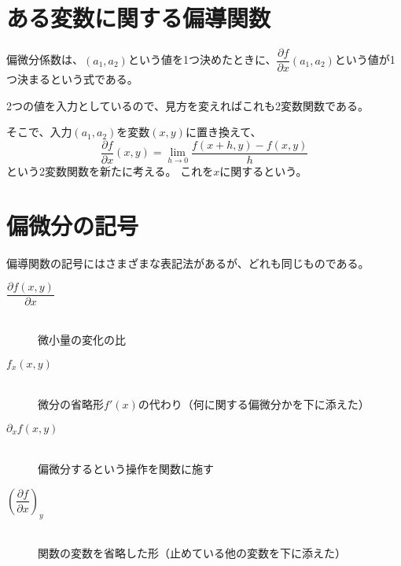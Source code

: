 \documentclass[../../../topic_multivariable-calculus]{subfiles}
\begin{document}
\sectionline
\section{ある変数に関する偏導関数}

偏微分係数は、$(a_1,a_2)$という値を1つ決めたときに、$\dfrac{\partial f}{\partial x}(a_1,a_2)$という値が1つ決まるという式である。

2つの値を入力としているので、見方を変えればこれも2変数関数である。

\br

そこで、入力$(a_1,a_2)$を変数$(x,y)$に置き換えて、
\begin{equation*}
  \dfrac{\partial f}{\partial x}(x,y) = \lim_{h \to 0} \frac{f(x + h, y) - f(x, y)}{h}
\end{equation*}
という2変数関数を新たに考える。
これを$x$に関するという。

\sectionline
\section{偏微分の記号}

偏導関数の記号にはさまざまな表記法があるが、どれも同じものである。

\begin{description}
  \item [$\dfrac{\partial f(x,y)}{\partial x}$]~\\ 微小量の変化の比
  \item [$f_x(x,y)$]~\\ 微分の省略形$f'(x)$の代わり（何に関する偏微分かを下に添えた）
  \item [$\partial_x f(x,y)$]~\\ 偏微分するという操作を関数に施す
  \item [$\left(\dfrac{\partial f }{\partial x}\right)_y$]~\\ 関数の変数を省略した形（止めている他の変数を下に添えた）
\end{description}
\end{document}
